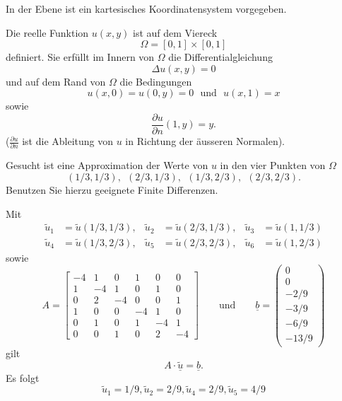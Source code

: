 In der Ebene ist ein kartesisches Koordinatensystem vorgegeben. 

\vspace{2mm}

Die reelle Funktion $u(x,y)$ ist auf dem Viereck
\[
\Omega = [0,1] \times [0,1]
\]
definiert. Sie erfüllt im Innern von $\Omega$ die
Differentialgleichung 
\[
\Delta u(x,y) = 0
\]
und auf dem Rand von $\Omega$ die Bedingungen
\[
u(x,0) = u(0,y) = 0 \ \ \ \mbox{und} \ \ \ u(x,1) = x
\]
sowie
\[
\frac{\partial u}{\partial n}(1,y) = y.
\]
($\frac{\partial
u}{\partial n}$ ist die Ableitung von $u$ in Richtung der äusseren
Normalen).

\vspace{2mm}

Gesucht ist eine Approximation der Werte von $u$ in den vier Punkten von
$\Omega$
\[
(1/3,1/3), \ \  (2/3,1/3), \ \ (1/3,2/3), \ \ (2/3,2/3).
\]
Benutzen Sie hierzu geeignete Finite Differenzen.

\begin{loesung}
Mit 
\begin{align*}
\tilde u_1&= \tilde u(1/3,1/3),&\tilde u_2&= \tilde u(2/3,1/3),&\tilde u_3&= \tilde u(1,1/3)\\
\tilde u_4&= \tilde u(1/3,2/3),&\tilde u_5&= \tilde u(2/3,2/3),&\tilde u_6&= \tilde u(1,2/3)
\end{align*}
sowie 
\[
A = \left[\begin{array}{rrrrrr} 
-4 & 1 & 0 & 1 & 0 & 0 \\
1 & -4 & 1 & 0 & 1 & 0 \\
0 & 2 & -4 & 0 & 0 & 1 \\
1 & 0 & 0 & -4 & 1 & 0 \\ 
0 & 1 & 0 & 1 & -4 & 1 \\
0 & 0 & 1 & 0 & 2 & -4 \end{array}\right]
\qquad 
\text{und}
\qquad
\underline{b} =  \left(\begin{array}{r} 0 \\ 0 \\ -2/9 \\ -3/9 \\ -6/9 \\ -13/9 \end{array}\right)
\]
gilt 
\[
A \cdot \underline{\tilde u} = \underline{b}.
\]
Es folgt 
\[
\tilde u_1 = 1/9, \tilde u_2 = 2/9, \tilde u_4 = 2/9, \tilde u_5 = 4/9
\]
\end{loesung}

